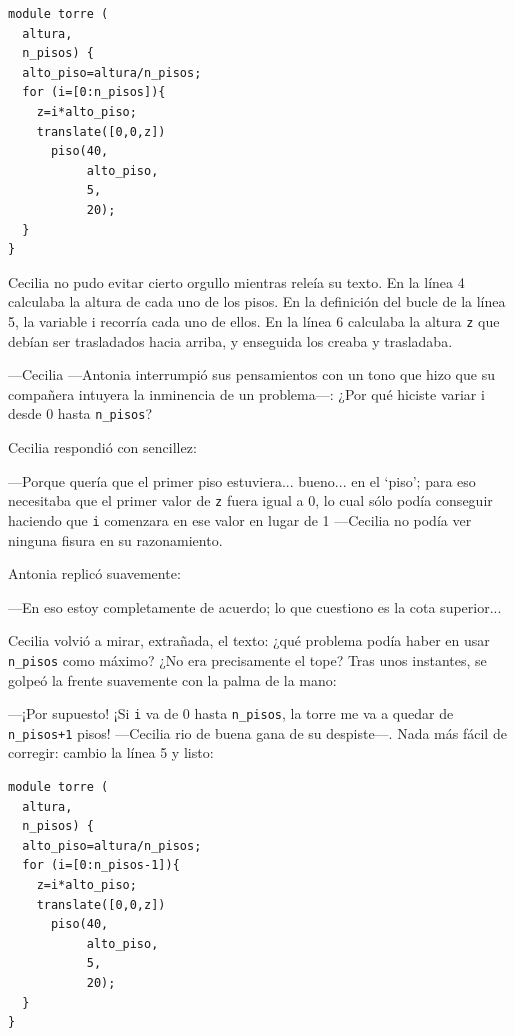     \begin{lstlisting}
module torre (
  altura,
  n_pisos) {
  alto_piso=altura/n_pisos;
  for (i=[0:n_pisos]){
    z=i*alto_piso;
    translate([0,0,z])
      piso(40,
           alto_piso,
           5,
           20);
  }
}
    \end{lstlisting}


    Cecilia no pudo evitar cierto orgullo mientras releía su texto. En
    la línea 4 calculaba la altura de cada uno de los pisos. En la
    definición del bucle de la línea 5, la variable i recorría cada
    uno de ellos. En la línea 6 calculaba la altura \texttt{z} que
    debían ser trasladados hacia arriba, y enseguida los creaba y
    trasladaba.

    ---Cecilia ---Antonia interrumpió sus pensamientos con un tono que
    hizo que su compañera intuyera la inminencia de un
    pro\-ble\-ma---: ¿Por qué hiciste variar i desde 0 hasta
    \texttt{n\_pisos}?

    Cecilia respondió con sencillez:

    ---Porque quería que el primer piso estuviera... bueno... en el
    `piso'; para eso necesitaba que el primer valor de \texttt{z}
    fuera igual a 0, lo cual sólo podía conseguir haciendo que
    \texttt{i} comenzara en ese valor en lugar de 1 ---Cecilia no
    podía ver ninguna fisura en su razonamiento.

    Antonia replicó suavemente:

    ---En eso estoy completamente de acuerdo; lo que cuestiono es la
    cota superior...

  Cecilia volvió a mirar, extrañada, el texto: ¿qué problema podía
  haber en usar \texttt{n\_pisos} como máximo? ¿No era precisamente el
  tope? Tras unos instantes, se golpeó la frente suavemente con la
  palma de la mano:

  ---¡Por supuesto! ¡Si \texttt{i} va de 0 hasta \texttt{n\_pisos}, la
  torre me va a quedar de \texttt{n\_pisos+1} pisos! ---Cecilia rio de
  buena gana de su des\-pis\-te---. Nada más fácil de corregir: cambio
  la línea 5 y listo:



    \begin{lstlisting}
module torre (
  altura,
  n_pisos) {
  alto_piso=altura/n_pisos;
  for (i=[0:n_pisos-1]){
    z=i*alto_piso;
    translate([0,0,z])
      piso(40,
           alto_piso,
           5,
           20);
  }
}
    \end{lstlisting}




